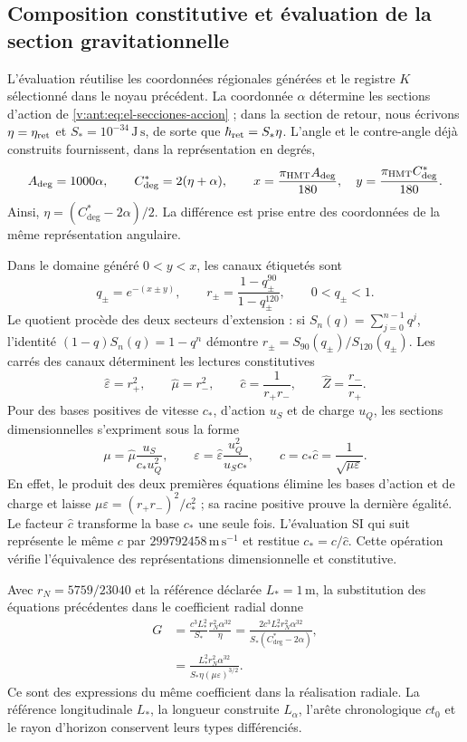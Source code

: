 \subsection{Composition constitutive et évaluation de la section gravitationnelle}
\label{g26:subsec:evaluacion-viii-es}

L'évaluation réutilise les coordonnées régionales générées et le registre
\(K\) sélectionné dans le noyau précédent. La coordonnée \(\alpha\)
détermine les sections d'action de
\eqref{v:ant:eq:el-secciones-accion} ; dans la section de retour, nous écrivons
\(\eta=\eta_{\rm ret}\) et \(S_*=10^{-34}\,\mathrm{J\,s}\), de sorte
que \(\hbar_{\rm ret}=S_*\eta\). L'angle et le contre-angle déjà
construits fournissent, dans la représentation en degrés,
\[
 A_{\deg}=1000\alpha,\qquad C^*_{\deg}=2(\eta+\alpha),\qquad
 x=\frac{\pi_{\rm HMT}A_{\deg}}{180},\quad
 y=\frac{\pi_{\rm HMT}C^*_{\deg}}{180}.
\]
Ainsi, \(\eta=(C^*_{\deg}-2\alpha)/2\). La différence est prise entre
des coordonnées de la même représentation angulaire.

Dans le domaine généré \(0<y<x\), les canaux étiquetés sont
\[
 q_\pm=e^{-(x\pm y)},\qquad
 r_\pm=\frac{1-q_\pm^{90}}{1-q_\pm^{120}},\qquad
 0<q_\pm<1.
\]
Le quotient procède des deux secteurs d'extension : si
\(S_n(q)=\sum_{j=0}^{n-1}q^j\), l'identité
\((1-q)S_n(q)=1-q^n\) démontre
\(r_\pm=S_{90}(q_\pm)/S_{120}(q_\pm)\).
Les carrés des canaux déterminent les lectures constitutives
\[
 \widehat\varepsilon=r_+^2,\qquad
 \widehat\mu=r_-^2,\qquad
 \widehat c=\frac1{r_+r_-},\qquad
 \widehat Z=\frac{r_-}{r_+}.
\]
Pour des bases positives de vitesse \(c_*\), d'action \(u_S\) et de charge
\(u_Q\), les sections dimensionnelles s'expriment sous la forme
\[
 \mu=\widehat\mu\frac{u_S}{c_*u_Q^2},\qquad
 \varepsilon=\widehat\varepsilon\frac{u_Q^2}{u_Sc_*},\qquad
 c=c_*\widehat c=\frac1{\sqrt{\mu\varepsilon}}.
\]
En effet, le produit des deux premières équations élimine les bases
d'action et de charge et laisse
\(\mu\varepsilon=(r_+r_-)^2/c_*^2\) ; sa racine positive prouve la
dernière égalité. Le facteur \(\widehat c\) transforme la base \(c_*\)
une seule fois. L'évaluation SI qui suit représente le même \(c\)
par \(299792458\,\mathrm{m\,s^{-1}}\) et restitue
\(c_*=c/\widehat c\). Cette opération vérifie l'équivalence des
représentations dimensionnelle et constitutive.

Avec \(r_N=5759/23040\) et la référence déclarée \(L_*=1\,\mathrm m\),
la substitution des équations précédentes dans le coefficient radial donne
\begin{align}
 G&=\frac{c^3L_*^2}{S_*}\frac{r_N^2\alpha^{32}}{\eta}
   =\frac{2c^3L_*^2r_N^2\alpha^{32}}
           {S_*(C^*_{\deg}-2\alpha)},\label{g26:eq:g-angular-viii-es}\\
  &=\frac{L_*^2r_N^2\alpha^{32}}
           {S_*\eta(\mu\varepsilon)^{3/2}}.
 \label{g26:eq:g-constitutivo-viii-es}
\end{align}
Ce sont des expressions du même coefficient dans la réalisation radiale. La
référence longitudinale \(L_*\), la longueur construite \(L_\alpha\),
l'arête chronologique \(ct_0\) et le rayon d'horizon conservent leurs
types différenciés.

